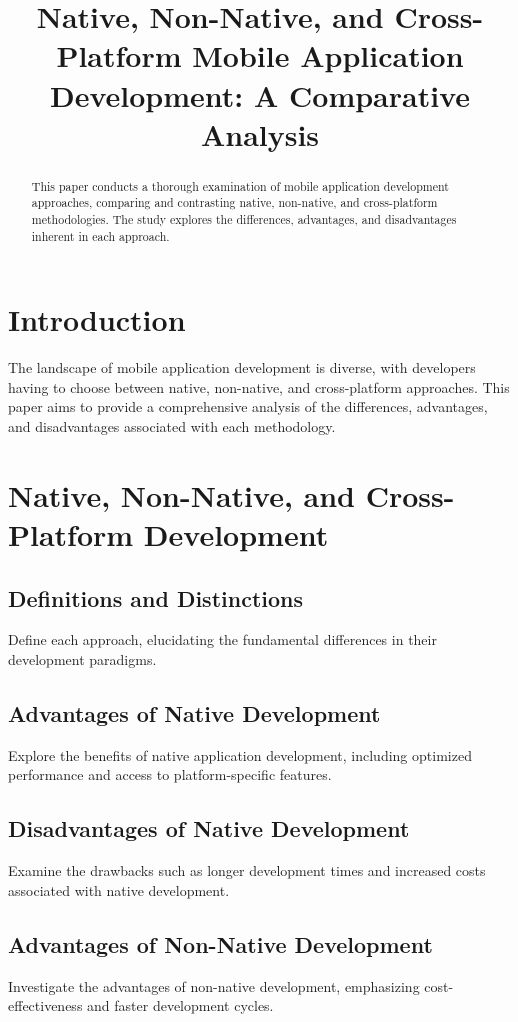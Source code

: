 \documentclass[conference]{IEEEtran}
\title{Native, Non-Native, and Cross-Platform Mobile Application Development: A Comparative Analysis}
\author{\IEEEauthorblockN{Castillo Mendez Josue Leonel}
	\IEEEauthorblockA{UTT\\
		0322103691@ut-tijuana.edu.mx}}
\date{}
\begin{document}
	
	\maketitle
	
	\begin{abstract}
		This paper conducts a thorough examination of mobile application development approaches, comparing and contrasting native, non-native, and cross-platform methodologies. The study explores the differences, advantages, and disadvantages inherent in each approach.
	\end{abstract}
	
	\section{Introduction}
	The landscape of mobile application development is diverse, with developers having to choose between native, non-native, and cross-platform approaches. This paper aims to provide a comprehensive analysis of the differences, advantages, and disadvantages associated with each methodology.
	
	\section{Native, Non-Native, and Cross-Platform Development}
	\subsection{Definitions and Distinctions}
	Define each approach, elucidating the fundamental differences in their development paradigms.
	
	\subsection{Advantages of Native Development}
	Explore the benefits of native application development, including optimized performance and access to platform-specific features.
	
	\subsection{Disadvantages of Native Development}
	Examine the drawbacks such as longer development times and increased costs associated with native development.
	
	\subsection{Advantages of Non-Native Development}
	Investigate the advantages of non-native development, emphasizing cost-effectiveness and faster development cycles.
	
\end{document}
